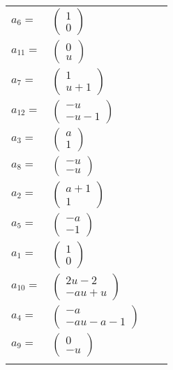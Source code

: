 \documentclass[1p]{elsarticle_modified}
\theoremstyle{definition}
\begin{document}
\begin{tabular}{m{7pt} m{180pt} m{7pt} m{180pt} }
\flushright $a_{6}=$&$\begin{pmatrix}1\\0\end{pmatrix}$ \\
\flushright $a_{11}=$&$\begin{pmatrix}0\\u\end{pmatrix}$ \\
\flushright $a_{7}=$&$\begin{pmatrix}1\\u+1\end{pmatrix}$ \\
\flushright $a_{12}=$&$\begin{pmatrix}- u\\- u-1\end{pmatrix}$ \\
\flushright $a_{3}=$&$\begin{pmatrix}a\\1\end{pmatrix}$ \\
\flushright $a_{8}=$&$\begin{pmatrix}- u\\- u\end{pmatrix}$ \\
\flushright $a_{2}=$&$\begin{pmatrix}a+1\\1\end{pmatrix}$ \\
\flushright $a_{5}=$&$\begin{pmatrix}- a\\-1\end{pmatrix}$ \\
\flushright $a_{1}=$&$\begin{pmatrix}1\\0\end{pmatrix}$ \\
\flushright $a_{10}=$&$\begin{pmatrix}2 u-2\\- a u+u\end{pmatrix}$ \\
\flushright $a_{4}=$&$\begin{pmatrix}- a\\- a u- a-1\end{pmatrix}$ \\
\flushright $a_{9}=$&$\begin{pmatrix}0\\- u\end{pmatrix}$\\&\end{tabular}
\end{document}
